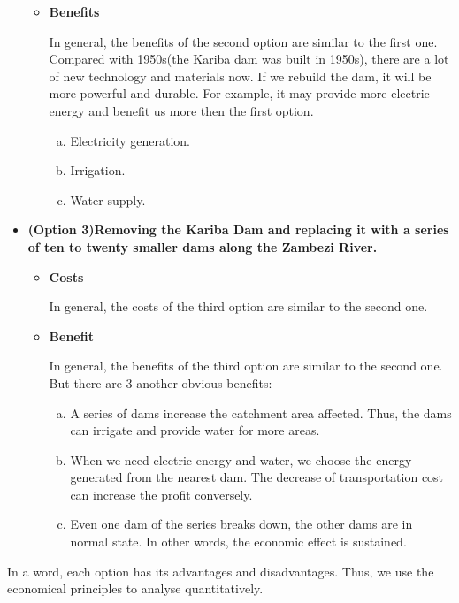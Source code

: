 \documentclass[12pt]{article}%
\begin{document}
\begin{itemize}
\begin{itemize}
    	\item{\textbf{Benefits}}
		\par\noindent
		In general, the benefits of the second option are similar to the first one. Compared with 1950s(the Kariba dam was built in 1950s), there are a lot of new technology and materials now. If we rebuild the dam, it will be more powerful and durable. For example, it may provide more electric energy and benefit us more then the first option.
			\begin{enumerate}[a.]
			\item Electricity generation.
			\item Irrigation.
			\item Water supply.
			\end{enumerate}
	\end{itemize}
	\item{\textbf{(Option 3)Removing the Kariba Dam and replacing it with a series of ten to twenty smaller dams along the Zambezi River.}}
	\begin{itemize}
    	\item{\textbf{Costs}}
		\par\noindent
		 In general, the costs of the third option are similar to the second one.
		\item{\textbf{Benefit}}
		\par\noindent
		In general, the benefits of the third option are similar to the second one. But there are 3 another obvious benefits:
			\begin{enumerate}[a.]
			\item A series of dams increase the catchment area affected. Thus, the dams can irrigate and provide water for more areas.
			\item When we need electric energy and water, we choose the energy generated from the nearest dam. The decrease of transportation cost can increase the profit conversely.
			\item Even one dam of the series breaks down, the other dams are in normal state. In other words, the economic effect is sustained.
			\end{enumerate}
	\end{itemize}	
\end{itemize}
	In a word, each option has its advantages and disadvantages. Thus, we use the economical principles to analyse quantitatively.
\end{document}
